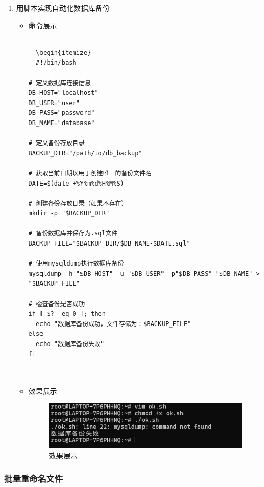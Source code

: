 \documentclass[UTF8]{ctexart}
\begin{document}
\begin{enumerate}
 \item 用脚本实现自动化数据库备份
  \begin{itemize}
  \item 命令展示

  \begin{verbatim}
   
  \begin{itemize}
  #!/bin/bash

# 定义数据库连接信息
DB_HOST="localhost"
DB_USER="user"
DB_PASS="password"
DB_NAME="database"

# 定义备份存放目录
BACKUP_DIR="/path/to/db_backup"

# 获取当前日期以用于创建唯一的备份文件名
DATE=$(date +%Y%m%d%H%M%S)

# 创建备份存放目录（如果不存在）
mkdir -p "$BACKUP_DIR"

# 备份数据库并保存为.sql文件
BACKUP_FILE="$BACKUP_DIR/$DB_NAME-$DATE.sql"

# 使用mysqldump执行数据库备份
mysqldump -h "$DB_HOST" -u "$DB_USER" -p"$DB_PASS" "$DB_NAME" > "$BACKUP_FILE"

# 检查备份是否成功
if [ $? -eq 0 ]; then
  echo "数据库备份成功，文件存储为：$BACKUP_FILE"
else
  echo "数据库备份失败"
fi

    
  \end{verbatim}

  \item 效果展示
  \begin{figure}[H]
    \centering
    \includegraphics[width=\textwidth]{6} %
    \caption{效果展示}
  
  \end{figure}
\end{itemize}
\end{enumerate}

\subsubsection{批量重命名文件}
\end{document}
